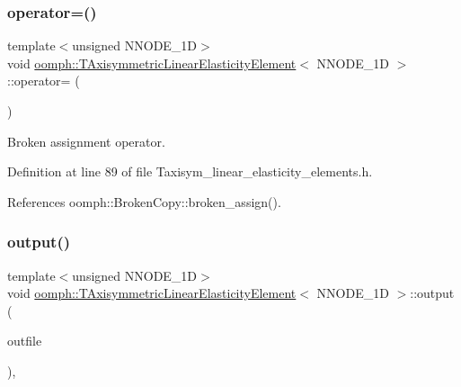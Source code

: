 \subsubsection{\texorpdfstring{operator=()}{operator=()}}
{\footnotesize\ttfamily template$<$unsigned N\+N\+O\+D\+E\+\_\+1D$>$ \\
void \hyperlink{classoomph_1_1TAxisymmetricLinearElasticityElement}{oomph\+::\+T\+Axisymmetric\+Linear\+Elasticity\+Element}$<$ N\+N\+O\+D\+E\+\_\+1D $>$\+::operator= (\begin{DoxyParamCaption}\item[{const \hyperlink{classoomph_1_1TAxisymmetricLinearElasticityElement}{T\+Axisymmetric\+Linear\+Elasticity\+Element}$<$ N\+N\+O\+D\+E\+\_\+1D $>$ \&}]{ }\end{DoxyParamCaption})\hspace{0.3cm}{\ttfamily [inline]}}



Broken assignment operator. 



Definition at line 89 of file Taxisym\+\_\+linear\+\_\+elasticity\+\_\+elements.\+h.



References oomph\+::\+Broken\+Copy\+::broken\+\_\+assign().

\mbox{\label{classoomph_1_1TAxisymmetricLinearElasticityElement_a803cb886b6c610f021fdfd41113eeab8}} 
\subsubsection{\texorpdfstring{output()}{output()}\hspace{0.1cm}{\footnotesize\ttfamily [1/4]}}
{\footnotesize\ttfamily template$<$unsigned N\+N\+O\+D\+E\+\_\+1D$>$ \\
void \hyperlink{classoomph_1_1TAxisymmetricLinearElasticityElement}{oomph\+::\+T\+Axisymmetric\+Linear\+Elasticity\+Element}$<$ N\+N\+O\+D\+E\+\_\+1D $>$\+::output (\begin{DoxyParamCaption}\item[{std\+::ostream \&}]{outfile }\end{DoxyParamCaption})\hspace{0.3cm}{\ttfamily [inline]}, {\ttfamily [virtual]}}



